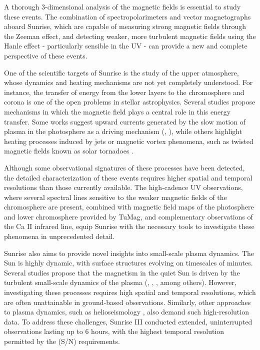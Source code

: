 A thorough 3-dimensional analysis of the magnetic fields is essential to study these events. The combination of spectropolarimeters and vector magnetographs aboard Sunrise, which are capable of measuring strong magnetic fields through the Zeeman effect, and detecting weaker, more turbulent \citep{quiet_sun_living_review} magnetic fields using the Hanle effect - particularly sensible in the UV - can provide a new and complete perspective of these events.  

One of the scientific targets of Sunrise is the study of the upper atmosphere, whose dynamics and heating mechanisms are not yet completely understood. For instance, the transfer of energy from the lower layers to the chromosphere and corona is one of the open problems in stellar astrophysics. Several studies propose mechanisms in which the magnetic field plays a central role in this energy transfer. Some works suggest upward currents generated by the slow motion of plasma in the photosphere as a driving mechanism (\cite{upwards1}, \cite{upwards2}), while others highlight heating processes induced by jets \citep{jetscorona} or magnetic vortex phenomena, such as twisted magnetic fields known as solar tornadoes \citep{solar_tornadoes}.

Although some observational signatures of these processes have been detected, the detailed characterization of these events requires higher spatial and temporal resolutions than those currently available. The high-cadence UV observations, where several spectral lines sensitive to the weaker magnetic fields of the chromosphere are present, combined with magnetic field maps of the photosphere and lower chromosphere provided by TuMag, and complementary observations of the Ca II infrared line, equip Sunrise with the necessary tools to investigate these phenomena in unprecedented detail.

Sunrise also aims to provide novel insights into small-scale plasma dynamics. The Sun is highly dynamic, with surface structures evolving on timescales of minutes. Several studies propose that the magnetism in the quiet Sun is driven by the turbulent small-scale dynamics of the plasma (\cite{small_scale_dynamo}, \cite{small_scale_dynamo_2}, \cite{small_scale_dynamo_3}, among others). However, investigating these processes requires high spatial and temporal resolutions, which are often unattainable in ground-based observations. Similarly, other approaches to plasma dynamics, such as helioseismology \citep{helioseismology}, also demand such high-resolution data. To address these challenges, Sunrise III conducted extended, uninterrupted observations lasting up to 6 hours, with the highest temporal resolution permitted by the (S/N) requirements.


